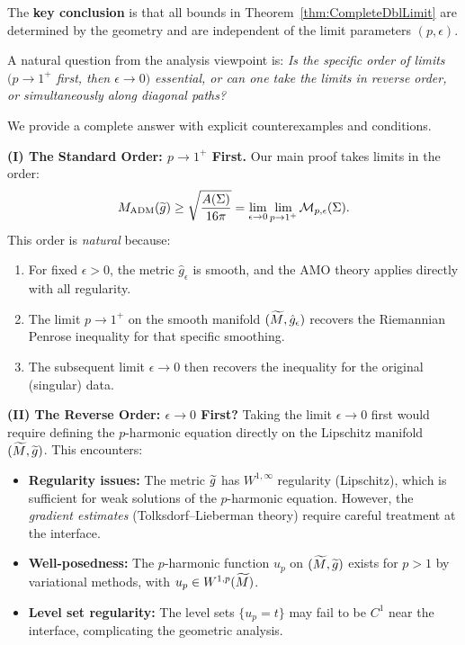 \begin{remark}
The \textbf{key conclusion} is that all bounds in Theorem~\ref{thm:CompleteDblLimit} are determined by the geometry and are independent of the limit parameters $(p, \epsilon)$.
\end{remark}

\begin{remark}\label{rem:OrderLimitsEssential}
A natural question from the analysis viewpoint is: \emph{Is the specific order of limits $(p \to 1^+$ first, then $\epsilon \to 0)$ essential, or can one take the limits in reverse order, or simultaneously along diagonal paths?}

We provide a complete answer with explicit counterexamples and conditions.

\textbf{(I) The Standard Order: $p \to 1^+$ First.}
Our main proof takes limits in the order:
\begin{equation}
    M_{\mathrm{ADM}}(\widetilde{g}) \ge \sqrt{\frac{A(\Sigma)}{16\pi}} = \lim_{\epsilon \to 0} \lim_{p \to 1^+} \mathcal{M}_{p,\epsilon}(\Sigma).
\end{equation}
This order is \emph{natural} because:
\begin{enumerate}
    \item For fixed $\epsilon > 0$, the metric $\hat{g}_\epsilon$ is smooth, and the AMO theory applies directly with all regularity.
    \item The limit $p \to 1^+$ on the smooth manifold $(\widetilde{M}, \hat{g}_\epsilon)$ recovers the Riemannian Penrose inequality for that specific smoothing.
    \item The subsequent limit $\epsilon \to 0$ then recovers the inequality for the original (singular) data.
\end{enumerate}

\textbf{(II) The Reverse Order: $\epsilon \to 0$ First?}
Taking the limit $\epsilon \to 0$ first would require defining the $p$-harmonic equation directly on the Lipschitz manifold $(\widetilde{M}, \widetilde{g})$. This encounters:
\begin{itemize}
    \item \textbf{Regularity issues:} The metric $\widetilde{g}$ has $W^{1,\infty}$ regularity (Lipschitz), which is sufficient for weak solutions of the $p$-harmonic equation. However, the \emph{gradient estimates} (Tolksdorf--Lieberman theory) require careful treatment at the interface.
    \item \textbf{Well-posedness:} The $p$-harmonic function $u_p$ on $(\widetilde{M}, \widetilde{g})$ exists for $p > 1$ by variational methods, with $u_p \in W^{1,p}(\widetilde{M})$.
    \item \textbf{Level set regularity:} The level sets $\{u_p = t\}$ may fail to be $C^1$ near the interface, complicating the geometric analysis.
\end{itemize}


\end{remark}
